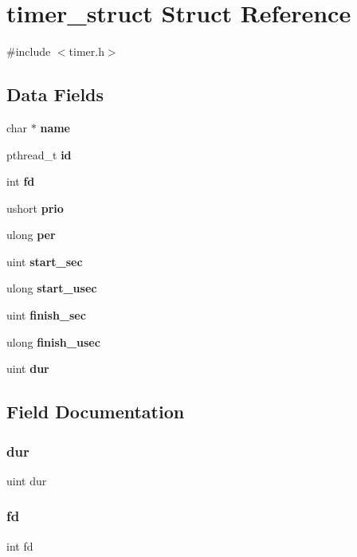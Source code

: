 \section{timer\+\_\+struct Struct Reference}
\label{structtimer__struct}


{\ttfamily \#include $<$timer.\+h$>$}

\subsection*{Data Fields}
\begin{DoxyCompactItemize}
\item 
char $\ast$ \textbf{ name}
\item 
pthread\+\_\+t \textbf{ id}
\item 
int \textbf{ fd}
\item 
ushort \textbf{ prio}
\item 
ulong \textbf{ per}
\item 
uint \textbf{ start\+\_\+sec}
\item 
ulong \textbf{ start\+\_\+usec}
\item 
uint \textbf{ finish\+\_\+sec}
\item 
ulong \textbf{ finish\+\_\+usec}
\item 
uint \textbf{ dur}
\end{DoxyCompactItemize}


\subsection{Field Documentation}
\mbox{\label{structtimer__struct_a7bd3256ac0677f7e737b83ed3c162fa8}} 
\subsubsection{dur}
{\footnotesize\ttfamily uint dur}

\mbox{\label{structtimer__struct_a6f8059414f0228f0256115e024eeed4b}} 
\subsubsection{fd}
{\footnotesize\ttfamily int fd}

\mbox{\label{structtimer__struct_a612d83030f5c1a86aaadf8b1fc07034a}} 
